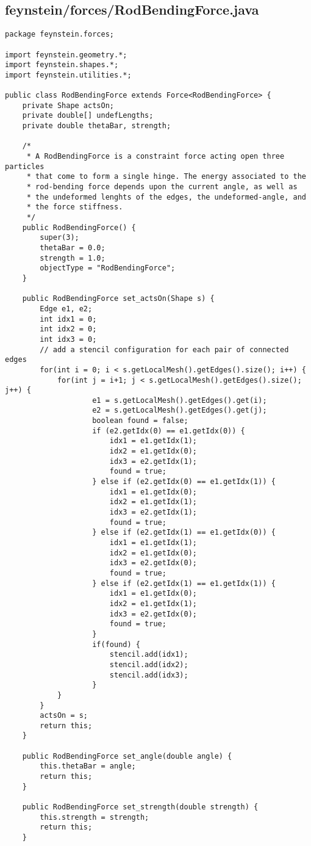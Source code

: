 \subsection*{feynstein/forces/RodBendingForce.java}
\begin{lstlisting}
package feynstein.forces;

import feynstein.geometry.*;
import feynstein.shapes.*;
import feynstein.utilities.*;

public class RodBendingForce extends Force<RodBendingForce> {
    private Shape actsOn;
	private double[] undefLengths;
    private double thetaBar, strength;

	/*
	 * A RodBendingForce is a constraint force acting open three particles
	 * that come to form a single hinge. The energy associated to the
	 * rod-bending force depends upon the current angle, as well as
	 * the undeformed lenghts of the edges, the undeformed-angle, and
	 * the force stiffness.
	 */
    public RodBendingForce() {
		super(3);
		thetaBar = 0.0;
		strength = 1.0;
		objectType = "RodBendingForce";
    }

    public RodBendingForce set_actsOn(Shape s) {
		Edge e1, e2;
		int idx1 = 0;
		int idx2 = 0;
		int idx3 = 0;
		// add a stencil configuration for each pair of connected edges
		for(int i = 0; i < s.getLocalMesh().getEdges().size(); i++) {
			for(int j = i+1; j < s.getLocalMesh().getEdges().size(); j++) {
					e1 = s.getLocalMesh().getEdges().get(i);
					e2 = s.getLocalMesh().getEdges().get(j);
					boolean found = false;
					if (e2.getIdx(0) == e1.getIdx(0)) {
						idx1 = e1.getIdx(1);
						idx2 = e1.getIdx(0);
						idx3 = e2.getIdx(1);
						found = true;
					} else if (e2.getIdx(0) == e1.getIdx(1)) {
						idx1 = e1.getIdx(0);
						idx2 = e1.getIdx(1);
						idx3 = e2.getIdx(1);
						found = true;
					} else if (e2.getIdx(1) == e1.getIdx(0)) {
						idx1 = e1.getIdx(1);
						idx2 = e1.getIdx(0);
						idx3 = e2.getIdx(0);
						found = true;
					} else if (e2.getIdx(1) == e1.getIdx(1)) {
						idx1 = e1.getIdx(0);
						idx2 = e1.getIdx(1);
						idx3 = e2.getIdx(0);
						found = true;
					}
					if(found) {
						stencil.add(idx1);
						stencil.add(idx2);
						stencil.add(idx3);
					}
			}
		}
		actsOn = s;
		return this;
    }

	public RodBendingForce set_angle(double angle) {
		this.thetaBar = angle;
		return this;
	}

    public RodBendingForce set_strength(double strength) {
		this.strength = strength;
		return this;
    }
	

\end{lstlisting}
